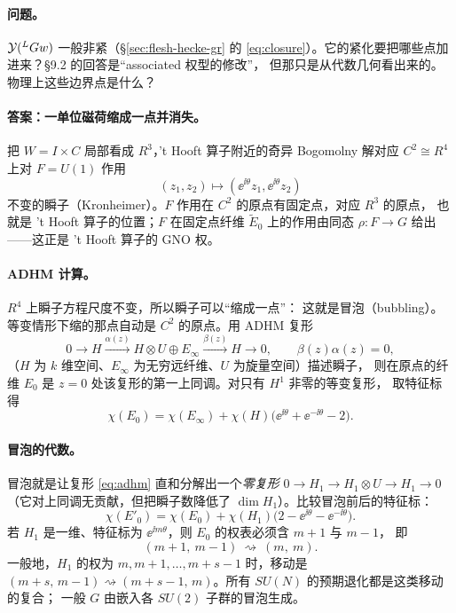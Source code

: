 \paragraph{问题。}$\mathcal{Y}({}^{L}G w)$ 一般非紧（§\ref{sec:flesh-hecke-gr} 的
\eqref{eq:closure}）。它的紧化要把哪些点加进来？§9.2 的回答是“associated 权型的修改”，
但那只是从代数几何看出来的。物理上这些边界点是什么？

\paragraph{答案：一单位磁荷缩成一点并消失。}
把 $W=I\times C$ 局部看成 $R^3$，'t Hooft{} 算子附近的奇异 Bogomolny 解对应
$C^2\cong R^4$ 上对 $F=U(1)$ 作用
\begin{equation}
(z_1,z_2)\longmapsto(\ee^{\ii\theta}z_1,\ee^{\ii\theta}z_2)
\label{eq:faction}
\end{equation}
不变的瞬子（Kronheimer）。$F$ 作用在 $C^2$ 的原点有固定点，对应 $R^3$ 的原点，
也就是 't Hooft{} 算子的位置；$F$ 在固定点纤维 $\widetilde E_0$ 上的作用由同态
$\rho:F\to G$ 给出——这正是 't Hooft{} 算子的 GNO 权。\pA{}

\paragraph{ADHM 计算。}$R^4$ 上瞬子方程尺度不变，所以瞬子可以“缩成一点”：
这就是冒泡（bubbling）。等变情形下缩的那点自动是 $C^2$ 的原点。用 ADHM 复形
\begin{equation}
0\to H\xrightarrow{\alpha(z)}H\otimes U\oplus E_\infty
\xrightarrow{\beta(z)}H\to0,\qquad \beta(z)\alpha(z)=0,
\label{eq:adhm}
\end{equation}
（$H$ 为 $k$ 维空间、$E_\infty$ 为无穷远纤维、$U$ 为旋量空间）描述瞬子，
则在原点的纤维 $E_0$ 是 $z=0$ 处该复形的第一上同调。对只有 $H^1$ 非零的等变复形，
取特征标得
\begin{equation}
\chi(E_0)=\chi(E_\infty)+\chi(H)\bigl(\ee^{\ii\theta}+\ee^{-\ii\theta}-2\bigr).
\label{eq:chiE0}
\end{equation}
\pA{}

\paragraph{冒泡的代数。}冒泡就是让复形 \eqref{eq:adhm} 直和分解出一个\emph{零复形}
$0\to H_1\to H_1\otimes U\to H_1\to0$（它对上同调无贡献，但把瞬子数降低了
$\dim H_1$）。比较冒泡前后的特征标：
\begin{equation}
\chi(E'_0)=\chi(E_0)+\chi(H_1)\bigl(2-\ee^{\ii\theta}-\ee^{-\ii\theta}\bigr).
\label{eq:bubble}
\end{equation}
若 $H_1$ 是一维、特征标为 $\ee^{\ii m\theta}$，则 $E_0$ 的权表必须含 $m+1$ 与 $m-1$，
即
\begin{equation}
(m+1,\ m-1)\ \rightsquigarrow\ (m,\ m).
\label{eq:weights}
\end{equation}
一般地，$H_1$ 的权为 $m,m+1,\dots,m+s-1$ 时，移动是
$(m+s,\,m-1)\rightsquigarrow(m+s-1,\,m)$。所有 $SU(N)$ 的预期退化都是这类移动的复合；
一般 $G$ 由嵌入各 $SU(2)$ 子群的冒泡生成。\pA{}

